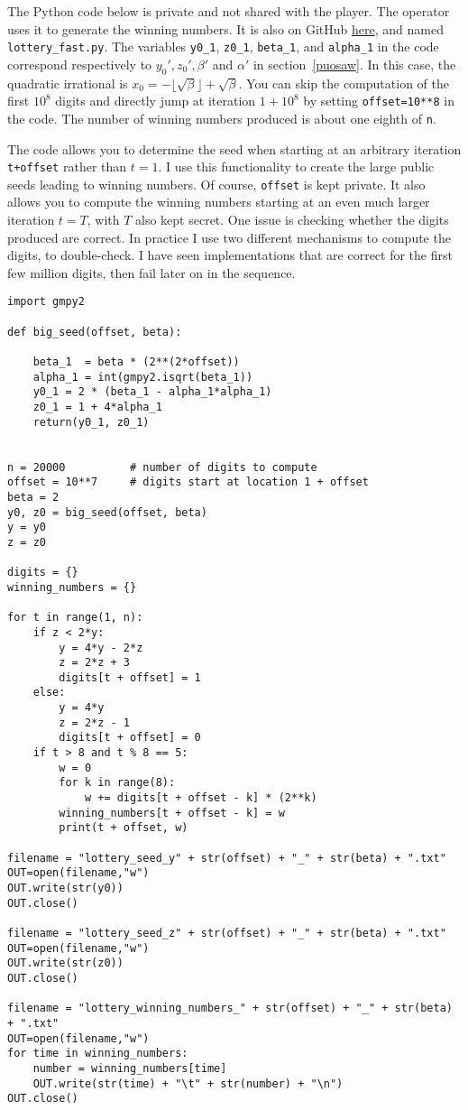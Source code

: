\documentclass[oneside,10pt]{book}
\begin{document}
The Python code below is private and not shared with the player. The operator uses it to generate the winning numbers. It is also on GitHub \href{https://github.com/VincentGranville/Stochastic-Processes/blob/master/lottery_fast.py}{here},
 and named \texttt{lottery\_fast.py}. The variables \texttt{y0\_1}, \texttt{z0\_1}, \texttt{beta\_1}, and 
\texttt{alpha\_1} in the code correspond respectively to $y_0', z_0', \beta'$ and $\alpha'$  in section~\ref{puosaw}.
In this case, the quadratic irrational is $x_0 = -\lfloor\sqrt{\beta}\rfloor  + \sqrt{\beta}$. You can skip
 the computation of the first $10^8$ digits and directly jump at iteration $1+ 10^8$ by
 setting \texttt{offset=10**8} in the code. The number of winning numbers produced is 
about one eighth of \texttt{n}.

The code allows you to determine the seed when starting at an arbitrary iteration \texttt{t+offset} rather
 than $t=1$. I use this functionality to create the large public seeds leading to winning numbers. Of course, \texttt{offset} is kept private. It also allows you to compute the winning numbers starting at an even much larger iteration $t=T$, with $T$ also kept secret. 
One issue is checking whether the digits produced are correct. In practice I use two different mechanisms to compute the digits, to double-check. I have seen implementations that are correct for the first few million digits, then fail later on in the sequence. \vspace{1ex}

 \begin{lstlisting}
import gmpy2

def big_seed(offset, beta):

    beta_1  = beta * (2**(2*offset)) 
    alpha_1 = int(gmpy2.isqrt(beta_1)) 
    y0_1 = 2 * (beta_1 - alpha_1*alpha_1)
    z0_1 = 1 + 4*alpha_1
    return(y0_1, z0_1)


n = 20000          # number of digits to compute 
offset = 10**7     # digits start at location 1 + offset
beta = 2
y0, z0 = big_seed(offset, beta)
y = y0
z = z0

digits = {}
winning_numbers = {}

for t in range(1, n): 
    if z < 2*y:
        y = 4*y - 2*z
        z = 2*z + 3
        digits[t + offset] = 1        
    else:
        y = 4*y
        z = 2*z - 1
        digits[t + offset] = 0   
    if t > 8 and t % 8 == 5:
        w = 0
        for k in range(8):
            w += digits[t + offset - k] * (2**k)
        winning_numbers[t + offset - k] = w
        print(t + offset, w)

filename = "lottery_seed_y" + str(offset) + "_" + str(beta) + ".txt"
OUT=open(filename,"w")
OUT.write(str(y0))
OUT.close()

filename = "lottery_seed_z" + str(offset) + "_" + str(beta) + ".txt"
OUT=open(filename,"w")
OUT.write(str(z0))
OUT.close()

filename = "lottery_winning_numbers_" + str(offset) + "_" + str(beta) + ".txt"
OUT=open(filename,"w")
for time in winning_numbers:
    number = winning_numbers[time]
    OUT.write(str(time) + "\t" + str(number) + "\n")
OUT.close()
\end{lstlisting}
\end{document}
